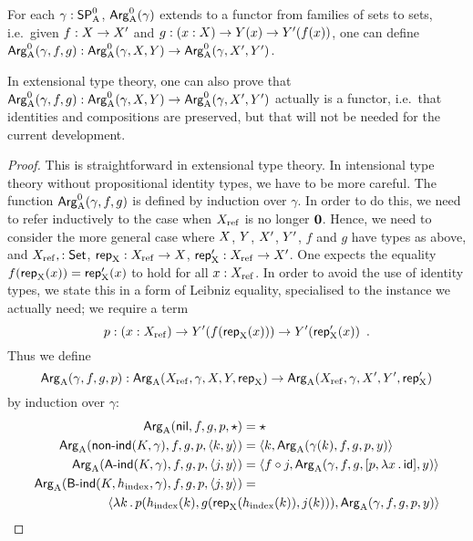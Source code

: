 \documentclass{article}
\begin{document}
\begin{lemma} %
  For each $\gamma : \mathsf{SP}^{0}_{\mathrm{A}}$, $\mathsf{Arg}^{0}_{\mathrm{A}}(\gamma)$ extends to a functor from
  families of sets to sets, i.e.\ given $f : X \to X'$ and $g : (x :
  X) \to Y(x) \to Y'(f(x))$, one can define $\mathsf{Arg}^{0}_{\mathrm{A}}(\gamma, f, g) :
  \mathsf{Arg}^{0}_{\mathrm{A}}(\gamma, X, Y) \to \mathsf{Arg}^{0}_{\mathrm{A}}(\gamma, X', Y')$.
\end{lemma}
\begin{remark}
  In extensional type theory, one can also prove that $\mathsf{Arg}^{0}_{\mathrm{A}}(\gamma,
  f, g) : \mathsf{Arg}^{0}_{\mathrm{A}}(\gamma, X, Y) \to \mathsf{Arg}^{0}_{\mathrm{A}}(\gamma, X', Y')$
  actually is a functor, i.e.\ that identities and compositions are
  preserved, but that will not be needed for the current development.
\end{remark}
\begin{proof}
  This is straightforward in extensional type theory. In intensional
  type theory without propositional identity types, we have to be more
  careful. The function $\mathsf{Arg}^{0}_{\mathrm{A}}(\gamma, f, g)$ is defined by induction
  over $\gamma$. In order to do this, we need to refer inductively to
  the case when $X_{\mathrm{ref}}$ is no longer $\mathbf{0}$. Hence, we need to
  consider the more general case where $X$, $Y$, $X'$, $Y'$, $f$
  and $g$ have types as above, and $X_{\mathrm{ref}}, : \mathsf{Set}$, $\mathsf{rep}_{\mathrm{X}} : X_{\mathrm{ref}} \to
  X$, $\mathsf{rep}_{\mathrm{X}}' : X_{\mathrm{ref}} \to X'$. One expects the equality $f(\mathsf{rep}_{\mathrm{X}}(x))
  = \mathsf{rep}_{\mathrm{X}}'(x)$ to hold for all $x : X_{\mathrm{ref}}$. In order to avoid the use
  of identity types, we state this in a form of Leibniz equality,
  specialised to the instance we actually need;  we require a term
  \[
  p : (x : X_{\mathrm{ref}}) \to Y'(f(\mathsf{rep}_{\mathrm{X}}(x))) \to Y'(\mathsf{rep}_{\mathrm{X}}'(x)) \enspace .
  \]
  Thus we define
  \[
  \ArgA(\gamma, f, g, p) : %
  \ArgA(\Xref, \gamma, \A, \B, \repA)
  \to \ArgA(\Xref, \gamma, \A', \B', \repA')
  \]
  by induction over $\gamma$:
  \begin{align*}
    \mathsf{Arg}_{\mathrm{A}}(\mathsf{nil}, f, g, p, \star) &= \star\\
    \mathsf{Arg}_{\mathrm{A}}(\mathsf{non}\text{-}\mathsf{ind}(K, \gamma), f, g, p, \langle k , y\rangle) &= \langle k , \mathsf{Arg}_{\mathrm{A}}(\gamma(k), f, g, p, y)\rangle\\
    \mathsf{Arg}_{\mathrm{A}}(\mathsf{A}\text{-}\mathsf{ind}(K, \gamma), f, g, p, \langle j , y\rangle) &= \langle f \circ j , \mathsf{Arg}_{\mathrm{A}}(\gamma, f, g, [p, \lambda x\,.\,\mathsf{id}], y)\rangle\\
    \mathsf{Arg}_{\mathrm{A}}(\mathsf{B}\text{-}\mathsf{ind}(K, h_{\mathrm{index}}, \gamma), f, g, p, \langle j , y\rangle) &= \\
    \langle \lambda k\,.\,p(h_{\mathrm{index}}(k), g(\mathsf{rep}_{\mathrm{X}}(&h_{\mathrm{index}}(k)), j(k))) , \mathsf{Arg}_{\mathrm{A}}(\gamma, f, g, p, y)\rangle
  \end{align*}
  

\end{proof}
\end{document}
